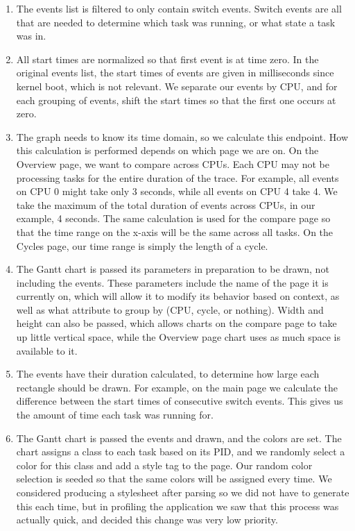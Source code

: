 \documentclass{hmcclinic}
\begin{document}
  \begin{enumerate}

    \item The events list is filtered to only contain switch events. Switch
      events are all that are needed to determine which task was running, or
      what state a task was in.
  
    \item All start times are normalized so that first event is at time zero.
      In the original events list, the start times of events are given in
      milliseconds since kernel boot, which is not relevant. We separate our
      events by CPU, and for each grouping of events, shift the start times
      so that the first one occurs at zero.
  
    \item The graph needs to know its time domain, so we calculate this
      endpoint. How this calculation is performed depends on which page we are
      on. On the Overview page, we want to compare across CPUs. Each CPU may not
      be processing tasks for the entire duration of the trace. For example, all
      events on CPU 0 might take only 3 seconds, while all events on CPU 4 take
      4. We take the maximum of the total duration of events across CPUs, in our
      example, 4 seconds. The same calculation is used for the compare page so
      that the time range on the x-axis will be the same across all tasks.  On
      the Cycles page, our time range is simply the length of a cycle.
  
    \item The Gantt chart is passed its parameters in preparation to be drawn,
      not including the events. These parameters include the name of the page it
      is currently on, which will allow it to modify its behavior based on
      context, as well as what attribute to group by (CPU, cycle, or nothing).
      Width and height can also be passed, which allows charts on the compare
      page to take up little vertical space, while the Overview page chart uses
      as much space is available to it.
  
   \item The events have their duration calculated, to determine how large each
     rectangle should be drawn. For example, on the main page we calculate the
     difference between the start times of consecutive switch events. This gives
     us the amount of time each task was running for.
  
   \item The Gantt chart is passed the events and drawn, and the colors are set.
     The chart assigns a class to each task based on its PID, and we randomly
     select a color for this class and add a style tag to the page. Our random
     color selection is seeded so that the same colors will be assigned every
     time. We considered producing a stylesheet after parsing so we did not have
     to generate this each time, but in profiling the application we saw that
     this process was actually quick, and decided this change was very low
     priority.

  \end{enumerate}
\end{document}
